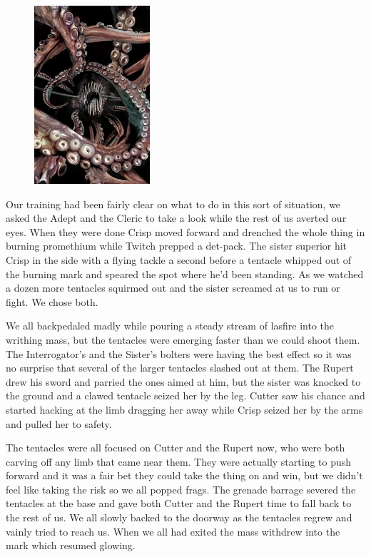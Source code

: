 \begin{figure}
	\begin{center}
		\includegraphics[width=\figwidth]{pics/6/8.png}
	\end{center}
\end{figure}
Our training had been fairly clear on what to do in this sort of situation, we asked the Adept and the Cleric to take a look while the rest of us averted our eyes. 
When they were done Crisp moved forward and drenched the whole thing in burning promethium while Twitch prepped a det-pack. 
The sister superior hit Crisp in the side with a flying tackle a second before a tentacle whipped out of the burning mark and speared the spot where he'd been standing. 
As we watched a dozen more tentacles squirmed out and the sister screamed at us to run or fight. 
We chose both.

We all backpedaled madly while pouring a steady stream of lasfire into the writhing mass, but the tentacles were emerging faster than we could shoot them. 
The Interrogator's and the Sister's bolters were having the best effect so it was no surprise that several of the larger tentacles slashed out at them. 
The Rupert drew his sword and parried the ones aimed at him, but the sister was knocked to the ground and a clawed tentacle seized her by the leg. 
Cutter saw his chance and started hacking at the limb dragging her away while Crisp seized her by the arms and pulled her to safety.

The tentacles were all focused on Cutter and the Rupert now, who were both carving off any limb that came near them. 
They were actually starting to push forward and it was a fair bet they could take the thing on and win, but we didn't feel like taking the risk so we all popped frags. 
The grenade barrage severed the tentacles at the base and gave both Cutter and the Rupert time to fall back to the rest of us. 
We all slowly backed to the doorway as the tentacles regrew and vainly tried to reach us. 
When we all had exited the mass withdrew into the mark which resumed glowing.

